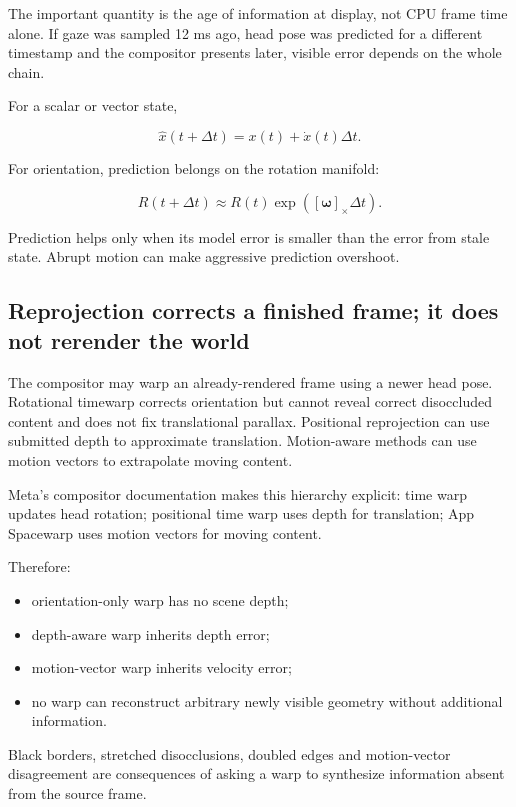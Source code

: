 The important quantity is the age of information at display, not CPU frame time alone. If gaze was sampled 12 ms ago, head pose was predicted for a different timestamp and the compositor presents later, visible error depends on the whole chain.

For a scalar or vector state,

\[
\hat{x}(t+\Delta t)=x(t)+\dot{x}(t)\Delta t.
\]

For orientation, prediction belongs on the rotation manifold:

\[
R(t+\Delta t)\approx R(t)\exp([\boldsymbol\omega]_\times\Delta t).
\]

Prediction helps only when its model error is smaller than the error from stale state. Abrupt motion can make aggressive prediction overshoot.

\subsection{Reprojection corrects a finished frame; it does not rerender the world}\label{04-visual-computing-ii-ch035-reprojection-corrects-a-finished-frame-it-does-not-rerender-the-world}

The compositor may warp an already-rendered frame using a newer head pose. Rotational timewarp corrects orientation but cannot reveal correct disoccluded content and does not fix translational parallax. Positional reprojection can use submitted depth to approximate translation. Motion-aware methods can use motion vectors to extrapolate moving content.

Meta's compositor documentation makes this hierarchy explicit: time warp updates head rotation; positional time warp uses depth for translation; App Spacewarp uses motion vectors for moving content.

Therefore:

\begin{itemize}
\tightlist
\item
  orientation-only warp has no scene depth;
\item
  depth-aware warp inherits depth error;
\item
  motion-vector warp inherits velocity error;
\item
  no warp can reconstruct arbitrary newly visible geometry without additional information.
\end{itemize}

Black borders, stretched disocclusions, doubled edges and motion-vector disagreement are consequences of asking a warp to synthesize information absent from the source frame.

